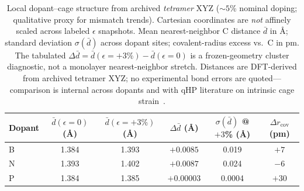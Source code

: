\begin{table}[t]
\caption{\label{tab:geometry}Local dopant--cage structure from archived \emph{tetramer} XYZ (${\sim}5$\% nominal doping; qualitative proxy for mismatch trends). Cartesian coordinates are \emph{not} affinely scaled across labeled $\epsilon$ snapshots.
Mean nearest-neighbor C distance $\bar{d}$ in \AA; standard deviation $\sigma(\bar{d})$ across dopant sites; covalent-radius excess vs.\ C in pm.
The tabulated $\Delta\bar{d}=\bar{d}(\epsilon{=}+3\%)-\bar{d}(\epsilon{=}0)$ is a frozen-geometry cluster diagnostic, not a monolayer nearest-neighbor stretch.
Distances are DFT-derived from archived tetramer XYZ; no experimental bond errors are quoted---comparison is internal across dopants and with qHP literature on intrinsic cage strain~\cite{Makov2023graphullerene,Tromer2022dft}.}
\begin{ruledtabular}
\begin{tabular}{lccccc}
Dopant & $\bar{d}(\epsilon{=}0)$ (\AA) & $\bar{d}(\epsilon{=}+3\%)$ (\AA) & $\Delta\bar{d}$ (\AA) & $\sigma(\bar{d})$ @ $+3$\% (\AA) & $\Delta r_{\mathrm{cov}}$ (pm) \\
\hline
B & 1.384 & 1.393 & $+0.0085$ & 0.019 & $+7$ \\
N & 1.393 & 1.402 & $+0.0087$ & 0.024 & $-6$ \\
P & 1.384 & 1.385 & $+0.00003$ & 0.0004 & $+30$ \\
\end{tabular}
\end{ruledtabular}
\end{table}
